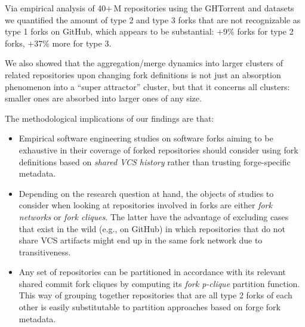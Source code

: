 Via empirical analysis of 40+\,M repositories using the GHTorrent and \SWH{}
datasets we quantified the amount of type 2 and type 3 forks that are not
recognizable as type 1 forks on GitHub, which appears to be substantial: +9\%
forks for type 2 forks, +37\% more for type 3.

We also showed that the aggregation/merge dynamics into larger clusters of
related repositories upon changing fork definitions is not just an absorption
phenomenon into a ``super attractor'' cluster, but that it concerns all
clusters: smaller ones are absorbed into larger ones of any size.

The methodological implications of our findings are that:
\begin{itemize}

\item Empirical software engineering studies on software forks aiming to be
  exhaustive in their coverage of forked repositories should consider using
  fork definitions based on \emph{shared VCS history} rather than trusting
  forge-specific metadata.

\item Depending on the research question at hand, the objects of studies to
  consider when looking at repositories involved in forks are either \emph{fork
    networks} or \emph{fork cliques}. The latter have the advantage of
  excluding cases that exist in the wild (e.g., on GitHub) in which
  repositories that do not share VCS artifacts might end up in the same fork
  network due to transitiveness.

\item Any set of repositories can be partitioned in accordance with its
  relevant shared commit fork cliques by computing its \emph{fork p-clique}
  partition function. This way of grouping together repositories that are all
  type 2 forks of each other is easily substitutable to partition approaches
  based on forge fork metadata.

\end{itemize}
